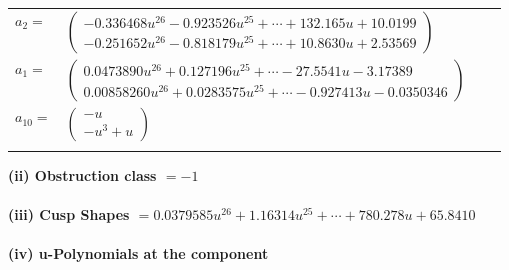 \documentclass[1p]{elsarticle_modified}
\theoremstyle{definition}
\begin{document}
\begin{tabular}{m{7pt} m{180pt} m{7pt} m{180pt} }
\flushright $a_{2}=$&$\begin{pmatrix}-0.336468 u^{26}-0.923526 u^{25}+\cdots+132.165 u+10.0199\\-0.251652 u^{26}-0.818179 u^{25}+\cdots+10.8630 u+2.53569\end{pmatrix}$ \\
\flushright $a_{1}=$&$\begin{pmatrix}0.0473890 u^{26}+0.127196 u^{25}+\cdots-27.5541 u-3.17389\\0.00858260 u^{26}+0.0283575 u^{25}+\cdots-0.927413 u-0.0350346\end{pmatrix}$ \\
\flushright $a_{10}=$&$\begin{pmatrix}- u\\- u^3+u\end{pmatrix}$\\&\end{tabular}
\flushleft \textbf{(ii) Obstruction class $= -1$}\\~\\
\flushleft \textbf{(iii) Cusp Shapes $= 0.0379585 u^{26}+1.16314 u^{25}+\cdots+780.278 u+65.8410$}\\~\\
\newpage\renewcommand{\arraystretch}{1}
\flushleft \textbf{(iv) u-Polynomials at the component}\newline \\
\end{document}
